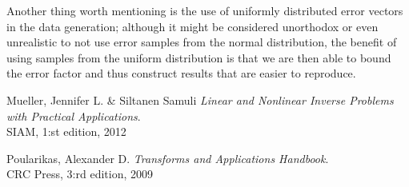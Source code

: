 \documentclass[12pt,a4]{article}
\begin{document}
Another thing worth mentioning is the use of uniformly distributed error vectors in the data generation; although it might be considered unorthodox or even unrealistic to not use error samples from the normal distribution, the benefit of using samples from the uniform distribution is that we are then able to bound the error factor and thus construct results that are easier to reproduce.


\newpage
\begin{thebibliography}{9}
	Mueller, Jennifer L. \& Siltanen Samuli \emph{Linear and Nonlinear Inverse Problems with Practical Applications}.\\
	SIAM, 1:st edition, 2012

    Poularikas, Alexander D. \emph{Transforms and Applications Handbook}.\\
    CRC Press, 3:rd edition, 2009 

\end{thebibliography}
\end{document}
